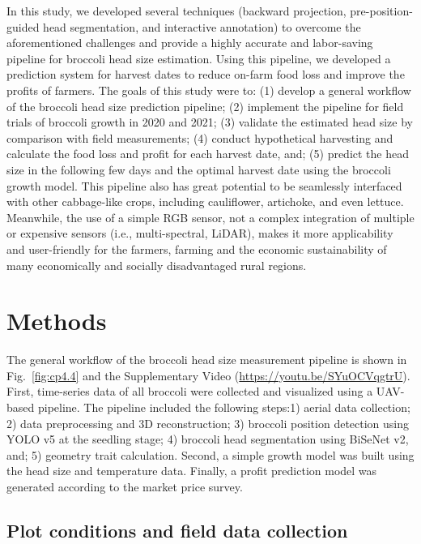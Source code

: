 In this study, we developed several techniques (backward projection, pre-position-guided head segmentation, and interactive annotation) to overcome the aforementioned challenges and provide a highly accurate and labor-saving pipeline for broccoli head size estimation. Using this pipeline, we developed a prediction system for harvest dates to reduce on-farm food loss and improve the profits of farmers. The goals of this study were to: (1) develop a general workflow of the broccoli head size prediction pipeline; (2) implement the pipeline for field trials of broccoli growth in 2020 and 2021; (3) validate the estimated head size by comparison with field measurements; (4) conduct hypothetical harvesting and calculate the food loss and profit for each harvest date, and; (5) predict the head size in the following few days and the optimal harvest date using the broccoli growth model. This pipeline also has great potential to be seamlessly interfaced with other cabbage-like crops, including cauliflower, artichoke, and even lettuce. Meanwhile, the use of a simple RGB sensor, not a complex integration of multiple or expensive sensors (i.e., multi-spectral, LiDAR), makes it more applicability and user-friendly for the farmers, farming and the economic sustainability of many economically and socially disadvantaged rural regions. 

\section{Methods}

The general workflow of the broccoli head size measurement pipeline is shown in Fig.~\ref{fig:cp4.4} and the Supplementary Video (\url{https://youtu.be/SYuOCVqgtrU}). First, time-series data of all broccoli were collected and visualized using a UAV-based pipeline. The pipeline included the following steps:1) aerial data collection; 2) data preprocessing and 3D reconstruction; 3) broccoli position detection using YOLO v5 at the seedling stage; 4) broccoli head segmentation using BiSeNet v2, and; 5) geometry trait calculation. Second, a simple growth model was built using the head size and temperature data. Finally, a profit prediction model was generated according to the market price survey.



\subsection{Plot conditions and field data collection}


